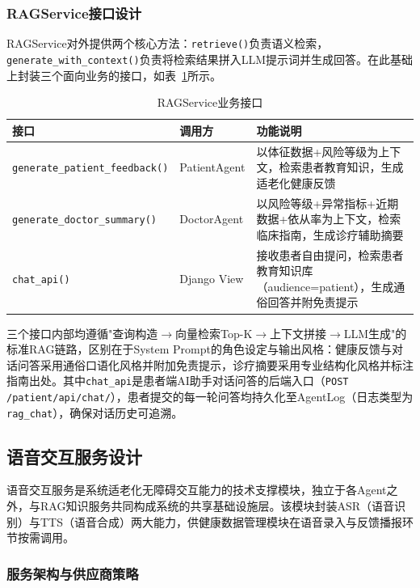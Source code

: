 \subsubsection{RAGService接口设计}

RAGService对外提供两个核心方法：\texttt{retrieve()}负责语义检索，\texttt{generate\_with\_context()}负责将检索结果拼入LLM提示词并生成回答。在此基础上封装三个面向业务的接口，如表~\ref{tab:rag-api}所示。

\begin{table}[H]
\centering
\caption{RAGService业务接口}
\label{tab:rag-api}
\begin{tabularx}{\textwidth}{|l|l|X|}
\hline
\textbf{接口} & \textbf{调用方} & \textbf{功能说明} \\
\hline
\texttt{generate\_patient\_feedback()} & PatientAgent & 以体征数据+风险等级为上下文，检索患者教育知识，生成适老化健康反馈 \\
\hline
\texttt{generate\_doctor\_summary()} & DoctorAgent & 以风险等级+异常指标+近期数据+依从率为上下文，检索临床指南，生成诊疗辅助摘要 \\
\hline
\texttt{chat\_api()} & Django View & 接收患者自由提问，检索患者教育知识库（audience=patient），生成通俗回答并附免责提示 \\
\hline
\end{tabularx}
\end{table}

三个接口内部均遵循"查询构造$\rightarrow$向量检索Top-K$\rightarrow$上下文拼接$\rightarrow$LLM生成"的标准RAG链路，区别在于System Prompt的角色设定与输出风格：健康反馈与对话问答采用通俗口语化风格并附加免责提示，诊疗摘要采用专业结构化风格并标注指南出处。其中\texttt{chat\_api}是患者端AI助手对话问答的后端入口（\texttt{POST /patient/api/chat/}），患者提交的每一轮问答均持久化至AgentLog（日志类型为\texttt{rag\_chat}），确保对话历史可追溯。


\subsection{语音交互服务设计}

语音交互服务是系统适老化无障碍交互能力的技术支撑模块，独立于各Agent之外，与RAG知识服务共同构成系统的共享基础设施层。该模块封装ASR（语音识别）与TTS（语音合成）两大能力，供健康数据管理模块在语音录入与反馈播报环节按需调用。

\subsubsection{服务架构与供应商策略}

